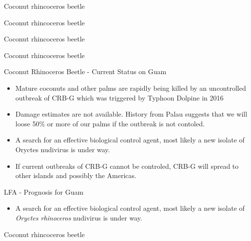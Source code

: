 \documentclass[]{beamer}
\begin{document}
\begin{frame}{Coconut rhincoceros beetle}
\end{frame}

\begin{frame}{Coconut rhincoceros beetle}
\end{frame}

\begin{frame}{Coconut rhincoceros beetle}
\end{frame}

\begin{frame}{Coconut rhincoceros beetle}
\end{frame}

\begin{frame}{Coconut Rhinoceros Beetle - Current Status on Guam}
	\begin{itemize}
		\item Mature coconuts and other palms are rapidly being killed by an uncontrolled outbreak of CRB-G which was triggered by Typhoon Dolpine in 2016
		\item Damage estimates are not available. History from Palau suggests that we will loose 50\% or more of our palms if the outbreak is not contoled.
		\item A search for an effective biological control agent, most likely a new isolate of Oryctes nudivirus is under way.
		\item If current outbreaks of CRB-G cannot be controled, CRB-G will spread to other islands and possibly the Americas.
	\end{itemize}
\end{frame}

\begin{frame}{LFA - Prognosis for Guam}
	\begin{itemize}
		\item A search for an effective biological control agent, most likely a new isolate of \textit{Oryctes rhinoceros} nudivirus is under way.
	\end{itemize}
\end{frame}

\begin{frame}{Coconut rhincoceros beetle}
\end{frame}
\end{document}
